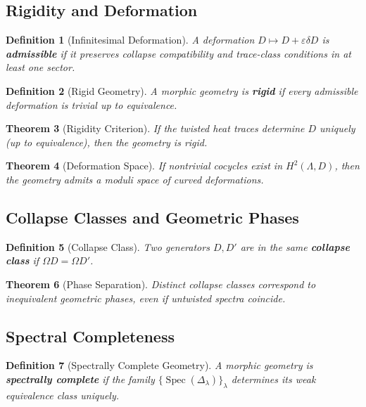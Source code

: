 \documentclass[12pt, oneside]{article}
\newtheorem{theorem}{Theorem}[section]
\newtheorem{definition}[theorem]{Definition}
\DeclareMathOperator{\Spec}{Spec}
\begin{document}
\subsection{Rigidity and Deformation}

\begin{definition}[Infinitesimal Deformation]
A deformation $D \mapsto D + \varepsilon \delta D$ is \textbf{admissible} if it preserves collapse compatibility and trace-class conditions in at least one sector.
\end{definition}

\begin{definition}[Rigid Geometry]
A morphic geometry is \textbf{rigid} if every admissible deformation is trivial up to equivalence.
\end{definition}

\begin{theorem}[Rigidity Criterion]
If the twisted heat traces determine $D$ uniquely (up to equivalence), then the geometry is rigid.
\end{theorem}

\begin{theorem}[Deformation Space]
If nontrivial cocycles exist in $H^2(\Lambda, D)$, then the geometry admits a moduli space of curved deformations.
\end{theorem}

\subsection{Collapse Classes and Geometric Phases}

\begin{definition}[Collapse Class]
Two generators $D, D'$ are in the same \textbf{collapse class} if $\Omega D = \Omega D'$.
\end{definition}

\begin{theorem}[Phase Separation]
Distinct collapse classes correspond to inequivalent geometric phases, even if untwisted spectra coincide.
\end{theorem}

\subsection{Spectral Completeness}

\begin{definition}[Spectrally Complete Geometry]
A morphic geometry is \textbf{spectrally complete} if the family $\{\Spec(\Delta_\lambda)\}_{\lambda}$ determines its weak equivalence class uniquely.
\end{definition}
\end{document}
